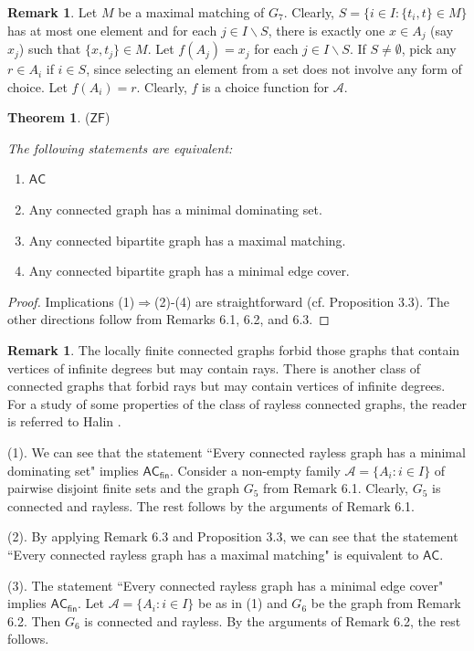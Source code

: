 \documentclass[12pt,reqno,a4paper]{amsart}
\theoremstyle{definition}
\newtheorem{thm}[defn]{Theorem}
\newtheorem{remark}[defn]{Remark}
\begin{document}
\begin{remark}
		Let $M$ be a maximal matching of $G_{7}$. Clearly, $S=\{i\in I:\{t_{i}, t\} \in M\}$ has at most one element and for each $j\in I\backslash S$, there is exactly one $x\in A_{j}$ (say $x_{j}$) such that $\{x,t_{j}\}\in M$. 
		Let $f(A_{j})=x_{j}$ for each $j\in I\backslash S$.
		If $S\neq\emptyset$, pick any $r\in A_{i}$ if $i\in S$, since selecting an element from a set does not involve any form of choice. Let $f(A_{i})=r$. Clearly, $f$ is a choice function for $\mathcal{A}$. 
	\end{remark}
	
	\begin{thm}{($\mathsf{ZF}$)}{\em The following statements are equivalent:
			\begin{enumerate}
				\item $\mathsf{AC}$
				\item Any connected graph has a minimal dominating set.
				\item Any connected bipartite graph has a maximal matching.
				\item Any connected bipartite graph has a minimal edge cover.
			\end{enumerate} 
		}
	\end{thm}
	
	\begin{proof}
		Implications (1)$\Rightarrow$(2)-(4) are straightforward (cf. Proposition 3.3). The other directions follow from Remarks 6.1, 6.2, and 6.3. 
	\end{proof}  
	
	\begin{remark}
		The locally finite connected graphs forbid those graphs that contain vertices of infinite degrees but may contain rays. There is another class of connected graphs that forbid rays but may contain vertices of infinite degrees. For a study of some properties of the class of rayless connected graphs, the reader is referred to Halin \cite{Hal1998}. 
		
		(1). We can see that the statement ``Every connected rayless graph has a minimal dominating set" implies $\mathsf{AC_{fin}}$. Consider a non-empty family $\mathcal{A}=\{A_{i}:i\in I\}$ of pairwise disjoint finite sets and the graph $G_{5}$ from Remark 6.1. Clearly, $G_{5}$ is connected and rayless. The rest follows by the arguments of Remark 6.1.
		
		(2). By applying
		Remark 6.3 and Proposition 3.3, we can see that the statement ``Every connected rayless graph has a maximal matching" is equivalent to $\mathsf{AC}$.
		
		(3). The statement ``Every connected rayless graph has a minimal edge cover" implies $\mathsf{AC_{fin}}$. Let $\mathcal{A}=\{A_{i}:i\in I\}$ be as in (1) and $G_{6}$ be the graph from Remark 6.2. Then $G_{6}$ is connected and rayless. By the arguments of Remark 6.2, the rest follows. 
	\end{remark} 
	
\end{document}
